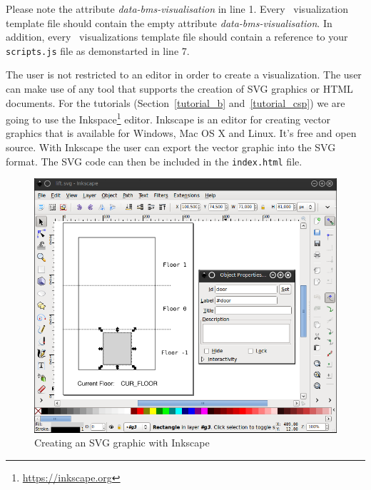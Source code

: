 Please note the attribute \textit{data-bms-visualisation} in line 1.
Every \bms\ visualization template file should contain the empty attribute \textit{data-bms-visualisation}.
In addition, every \bms\ visualizations template file should contain a reference to your \texttt{scripts.js} file as demonstarted in line 7.


The user is not restricted to an editor in order to create a visualization.
The user can make use of any tool that supports the creation of SVG graphics or HTML documents.
For the tutorials (Section~\ref{tutorial_b} and~\ref{tutorial_csp}) we are going to use the Inkspace\footnote{\url{https://inkscape.org}} editor. Inkscape is an editor for creating vector graphics that is available for Windows, Mac OS X and Linux.
It's free and open source.
With Inkscape the user can export the vector graphic into the SVG format.
The SVG code can then be included in the \texttt{index.html} file.

\begin{figure}[!ht]
\begin{center}
	\includegraphics[width=12cm]{img/tutorial/tut_02.png}
	\caption{Creating an SVG graphic with Inkscape}
	\label{fig_tut_02_inkscape}
\end{center}
\end{figure} 

